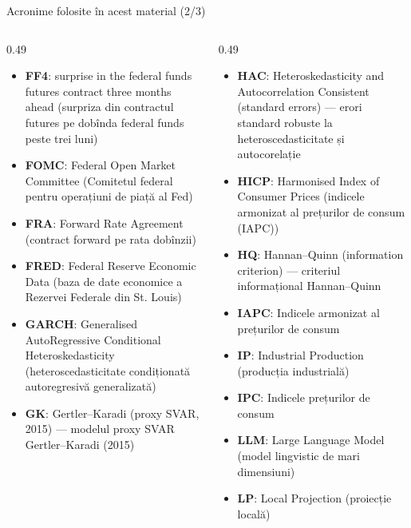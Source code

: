 \begin{frame}{Acronime folosite în acest material (2/3)}
\begin{columns}[T]
\begin{column}{0.49\textwidth}
\begin{itemize}\setlength{\itemsep}{0pt}
    \item \textbf{FF4}: surprise in the federal funds futures contract three months ahead (surpriza din contractul futures pe dobînda federal funds peste trei luni)
    \item \textbf{FOMC}: Federal Open Market Committee (Comitetul federal pentru operațiuni de piață al Fed)
    \item \textbf{FRA}: Forward Rate Agreement (contract forward pe rata dobînzii)
    \item \textbf{FRED}: Federal Reserve Economic Data (baza de date economice a Rezervei Federale din St. Louis)
    \item \textbf{GARCH}: Generalised AutoRegressive Conditional Heteroskedasticity (heteroscedasticitate condiționată autoregresivă generalizată)
    \item \textbf{GK}: Gertler–Karadi (proxy SVAR, 2015) — modelul proxy SVAR Gertler–Karadi (2015)
\end{itemize}
\end{column}
\begin{column}{0.49\textwidth}
\begin{itemize}\setlength{\itemsep}{0pt}
    \item \textbf{HAC}: Heteroskedasticity and Autocorrelation Consistent (standard errors) — erori standard robuste la heteroscedasticitate și autocorelație
    \item \textbf{HICP}: Harmonised Index of Consumer Prices (indicele armonizat al prețurilor de consum (IAPC))
    \item \textbf{HQ}: Hannan–Quinn (information criterion) — criteriul informațional Hannan–Quinn
    \item \textbf{IAPC}: Indicele armonizat al prețurilor de consum
    \item \textbf{IP}: Industrial Production (producția industrială)
    \item \textbf{IPC}: Indicele prețurilor de consum
    \item \textbf{LLM}: Large Language Model (model lingvistic de mari dimensiuni)
    \item \textbf{LP}: Local Projection (proiecție locală)
\end{itemize}
\end{column}
\end{columns}
\end{frame}
